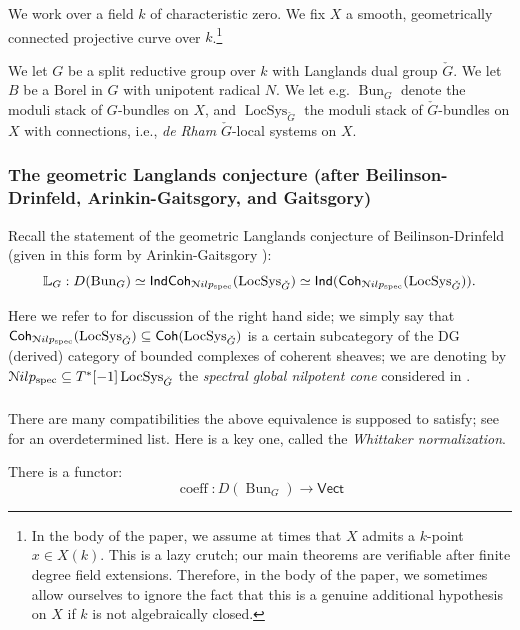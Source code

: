 \documentclass[reqno,11pt]{amsart}
\numberwithin{equation}{subsection}
\theoremstyle{remark}
\newcommand{\bL}{{\mathbb L}}
\newcommand{\sN}{{\EuScript N}}
\newcommand{\on}{\operatorname}
\newcommand{\Vect}{\mathsf{Vect}}
\newcommand{\Bun}{\on{Bun}}
\newcommand{\LocSys}{\on{LocSys}}
\newcommand{\Ind}{\mathsf{Ind}}
\newcommand{\Coh}{\mathsf{Coh}}
\newcommand{\IndCoh}{\mathsf{IndCoh}}
\renewcommand{\subset}{\subseteq}
\newcommand{\coeff}{\on{coeff}}
\newcommand{\Nilp}{\sN ilp}
\begin{document}
We work over a field $k$ of characteristic zero. We fix $X$ a smooth,
geometrically connected projective curve over $k$.\footnote{In the body of
the paper, we assume at times that $X$ admits a $k$-point $x \in X(k)$.
This is a lazy crutch; our main theorems are verifiable after finite
degree field extensions. Therefore, in the body of the paper, 
we sometimes allow ourselves to ignore the fact that
this is a genuine additional hypothesis on $X$ if $k$ is not algebraically closed.}

We let $G$ be a split reductive group over $k$ with Langlands dual group 
$\check{G}$. We let $B$ be a Borel in $G$ with unipotent radical $N$.
We let e.g. $\Bun_G$ denote the moduli stack of $G$-bundles
on $X$, and $\LocSys_{\check{G}}$ the moduli stack of $\check{G}$-bundles on $X$
with connections, i.e., \emph{de Rham} $\check{G}$-local systems on $X$.

\subsubsection{The geometric Langlands conjecture (after Beilinson-Drinfeld,
Arinkin-Gaitsgory, and Gaitsgory)}

Recall the statement of the geometric Langlands conjecture of
Beilinson-Drinfeld (given in this form by Arinkin-Gaitsgory \cite{arinkin-gaitsgory}):
%
\[
\bL_G:D(\Bun_G) \simeq \IndCoh_{\Nilp_{\on{spec}}}(\LocSys_{\check{G}}) 
\simeq \Ind(\Coh_{\Nilp_{\on{spec}}}(\LocSys_{\check{G}})).
\]

\noindent Here we refer to \cite{arinkin-gaitsgory} for discussion of
the right hand side; we simply say that 
$\Coh_{\Nilp_{\on{spec}}}(\LocSys_{\check{G}}) \subset \Coh(\LocSys_{\check{G}})$
is a certain subcategory of the DG (derived) category of bounded complexes of coherent
sheaves; we are denoting by $\Nilp_{\on{spec}} \subset T^*[-1] \LocSys_{\check{G}}$
the \emph{spectral global nilpotent cone} considered in \cite{arinkin-gaitsgory}.

\subsubsection{}

There are many compatibilities the above equivalence is supposed to satisfy;
see \cite{dennis-laumonconf} for an overdetermined list.
Here is a key one, called the \emph{Whittaker normalization}.

There is a functor:
%
\[
\coeff:D(\Bun_G) \to \Vect
\]
\end{document}
